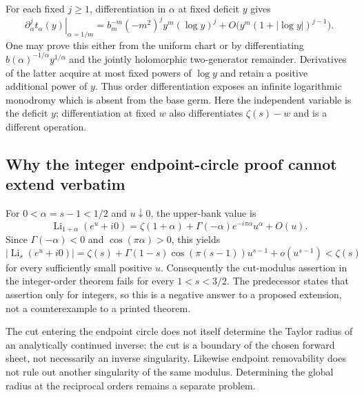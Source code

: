 For each fixed $j\ge1$, differentiation in $\alpha$ at fixed deficit
$y$ gives
\[
 \left.\partial_\alpha^j t_\alpha(y)\right|_{\alpha=1/m}
 =b_m^{-m}(-m^2)^j y^m(\log y)^j
 +O\bigl(y^m(1+|\log y|)^{j-1}\bigr).
\]
One may prove this either from the uniform chart or by differentiating
$b(\alpha)^{-1/\alpha}y^{1/\alpha}$ and the jointly holomorphic
two-generator remainder.  Derivatives of the latter acquire at most
fixed powers of $\log y$ and retain a positive additional power of
$y$.  Thus order differentiation exposes an infinite logarithmic
monodromy which is absent from the base germ.
Here the independent variable is the deficit $y$; differentiation at
fixed $w$ also differentiates $\zeta(s)-w$ and is a different operation.

\subsection{Why the integer endpoint-circle proof cannot extend verbatim}

For $0<\alpha=s-1<1/2$ and $u\downarrow0$, the upper-bank value is
\[
 \operatorname{Li}_{1+\alpha}(e^u+i0)
 =\zeta(1+\alpha)+\Gamma(-\alpha)e^{-i\pi\alpha}u^\alpha+O(u).
\]
Since $\Gamma(-\alpha)<0$ and $\cos(\pi\alpha)>0$, this yields
\[
 |\operatorname{Li}_{s}(e^u+i0)|
 =\zeta(s)+\Gamma(1-s)\cos(\pi(s-1))u^{s-1}
 +o(u^{s-1})<\zeta(s)
\]
for every sufficiently small positive $u$.
Consequently the cut-modulus assertion in the integer-order theorem
fails for every $1<s<3/2$.  The predecessor states that assertion only
for integers, so this is a negative answer to a proposed extension,
not a counterexample to a printed theorem.

The cut entering the endpoint circle does not itself determine the
Taylor radius of an analytically continued inverse: the cut is a
boundary of the chosen forward sheet, not necessarily an inverse
singularity.  Likewise endpoint removability does not rule out another
singularity of the same modulus.  Determining the global radius at the
reciprocal orders remains a separate problem.

